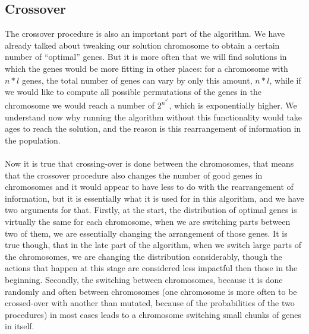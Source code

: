 \documentclass{article}
\begin{document}
\subsection{Crossover}
The crossover procedure is also an important part of the algorithm. We have already talked about tweaking our solution chromosome to obtain a certain number of “optimal” genes. But it is more often that we will find solutions in which the genes would be more fitting in other places: for a chromosome with $n*l$ genes, the total number of genes can vary by only this amount,  $n*l$, while if we would like to compute all possible permutations of the genes in the chromosome we would reach a number of $2^n^*^l$, which is exponentially higher. We understand now why running the algorithm without this functionality would take ages to reach the solution, and the reason is this rearrangement of information in the population. \\\\
Now it is true that crossing-over is done between the chromosomes, that means that the crossover procedure also changes the number of good genes in chromosomes and it would appear to have less to do with the rearrangement of information, but it is essentially what it is used for in this algorithm, and we have two arguments for that. Firstly, at the start, the distribution of optimal genes is virtually the same for each chromosome, when we are switching parts between two of them, we are essentially changing the arrangement of those genes. It is true though, that in the late part of the algorithm, when we switch large parts of the chromosomes, we are changing the distribution considerably, though the actions that happen at this stage are considered less impactful then those in the beginning. Secondly, the switching between chromosomes, because it is done randomly and often between chromosomes (one chromosome is more often to be crossed-over with another than mutated, because of the probabilities of the two procedures) in most cases leads to a chromosome switching small chunks of genes in itself.
\end{document}
